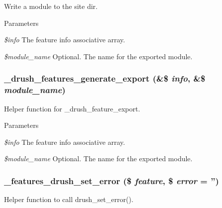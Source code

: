\label{features_8drush_8inc_a3773d63fc524e8440924d9f79cc1231a}
Write a module to the site dir.


\begin{DoxyParams}{Parameters}
\item[{\em \$info}]The feature info associative array. \item[{\em \$module\_\-name}]Optional. The name for the exported module. \end{DoxyParams}
\hypertarget{features_8drush_8inc_aa7000926946fab9e88e2f1798e6ec688}{
\subsubsection[{\_\-drush\_\-features\_\-generate\_\-export}]{\setlength{\rightskip}{0pt plus 5cm}\_\-drush\_\-features\_\-generate\_\-export (\&\$ {\em info}, \/  \&\$ {\em module\_\-name})}}
\label{features_8drush_8inc_aa7000926946fab9e88e2f1798e6ec688}
Helper function for \_\-drush\_\-feature\_\-export.


\begin{DoxyParams}{Parameters}
\item[{\em \$info}]The feature info associative array. \item[{\em \$module\_\-name}]Optional. The name for the exported module. \end{DoxyParams}
\hypertarget{features_8drush_8inc_a4561151a5ec9bf2f20e09ad0f047d5bd}{
\subsubsection[{\_\-features\_\-drush\_\-set\_\-error}]{\setlength{\rightskip}{0pt plus 5cm}\_\-features\_\-drush\_\-set\_\-error (\$ {\em feature}, \/  \$ {\em error} = {\ttfamily ''})}}
\label{features_8drush_8inc_a4561151a5ec9bf2f20e09ad0f047d5bd}
Helper function to call drush\_\-set\_\-error().


